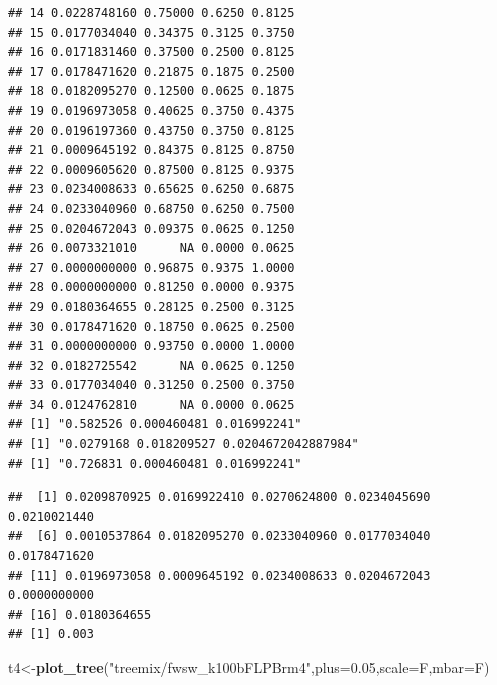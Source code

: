 \documentclass[]{article}
\newenvironment{Shaded}{\begin{snugshade}}{\end{snugshade}}
\newcommand{\KeywordTok}[1]{\textcolor[rgb]{0.13,0.29,0.53}{\textbf{#1}}}
\newcommand{\DataTypeTok}[1]{\textcolor[rgb]{0.13,0.29,0.53}{#1}}
\newcommand{\FloatTok}[1]{\textcolor[rgb]{0.00,0.00,0.81}{#1}}
\newcommand{\StringTok}[1]{\textcolor[rgb]{0.31,0.60,0.02}{#1}}
\newcommand{\NormalTok}[1]{#1}
\begin{document}
\begin{verbatim}
## 14 0.0228748160 0.75000 0.6250 0.8125
## 15 0.0177034040 0.34375 0.3125 0.3750
## 16 0.0171831460 0.37500 0.2500 0.8125
## 17 0.0178471620 0.21875 0.1875 0.2500
## 18 0.0182095270 0.12500 0.0625 0.1875
## 19 0.0196973058 0.40625 0.3750 0.4375
## 20 0.0196197360 0.43750 0.3750 0.8125
## 21 0.0009645192 0.84375 0.8125 0.8750
## 22 0.0009605620 0.87500 0.8125 0.9375
## 23 0.0234008633 0.65625 0.6250 0.6875
## 24 0.0233040960 0.68750 0.6250 0.7500
## 25 0.0204672043 0.09375 0.0625 0.1250
## 26 0.0073321010      NA 0.0000 0.0625
## 27 0.0000000000 0.96875 0.9375 1.0000
## 28 0.0000000000 0.81250 0.0000 0.9375
## 29 0.0180364655 0.28125 0.2500 0.3125
## 30 0.0178471620 0.18750 0.0625 0.2500
## 31 0.0000000000 0.93750 0.0000 1.0000
## 32 0.0182725542      NA 0.0625 0.1250
## 33 0.0177034040 0.31250 0.2500 0.3750
## 34 0.0124762810      NA 0.0000 0.0625
## [1] "0.582526 0.000460481 0.016992241"
## [1] "0.0279168 0.018209527 0.0204672042887984"
## [1] "0.726831 0.000460481 0.016992241"
\end{verbatim}

\begin{verbatim}
##  [1] 0.0209870925 0.0169922410 0.0270624800 0.0234045690 0.0210021440
##  [6] 0.0010537864 0.0182095270 0.0233040960 0.0177034040 0.0178471620
## [11] 0.0196973058 0.0009645192 0.0234008633 0.0204672043 0.0000000000
## [16] 0.0180364655
## [1] 0.003
\end{verbatim}

\begin{Shaded}
\begin{Highlighting}[]
\NormalTok{t4<-}\KeywordTok{plot_tree}\NormalTok{(}\StringTok{"treemix/fwsw_k100bFLPBrm4"}\NormalTok{,}\DataTypeTok{plus=}\FloatTok{0.05}\NormalTok{,}\DataTypeTok{scale=}\NormalTok{F,}\DataTypeTok{mbar=}\NormalTok{F)}
\end{Highlighting}
\end{Shaded}
\end{document}
